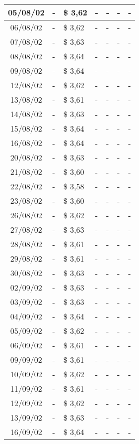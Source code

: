 \begin{center}
\begin{longtable}{|c|p{1.5cm}|p{1.5cm}|p{1.5cm}|p{1.5cm}|p{1.5cm}|p{1.5cm}|}
05/08/02 & - & \$ 3,62 & - & - & - & - \\ \hline
06/08/02 & - & \$ 3,62 & - & - & - & - \\ \hline
07/08/02 & - & \$ 3,63 & - & - & - & - \\ \hline
08/08/02 & - & \$ 3,64 & - & - & - & - \\ \hline
09/08/02 & - & \$ 3,64 & - & - & - & - \\ \hline
12/08/02 & - & \$ 3,62 & - & - & - & - \\ \hline
13/08/02 & - & \$ 3,61 & - & - & - & - \\ \hline
14/08/02 & - & \$ 3,63 & - & - & - & - \\ \hline
15/08/02 & - & \$ 3,64 & - & - & - & - \\ \hline
16/08/02 & - & \$ 3,64 & - & - & - & - \\ \hline
20/08/02 & - & \$ 3,63 & - & - & - & - \\ \hline
21/08/02 & - & \$ 3,60 & - & - & - & - \\ \hline
22/08/02 & - & \$ 3,58 & - & - & - & - \\ \hline
23/08/02 & - & \$ 3,60 & - & - & - & - \\ \hline
26/08/02 & - & \$ 3,62 & - & - & - & - \\ \hline
27/08/02 & - & \$ 3,63 & - & - & - & - \\ \hline
28/08/02 & - & \$ 3,61 & - & - & - & - \\ \hline
29/08/02 & - & \$ 3,61 & - & - & - & - \\ \hline
30/08/02 & - & \$ 3,63 & - & - & - & - \\ \hline
02/09/02 & - & \$ 3,63 & - & - & - & - \\ \hline
03/09/02 & - & \$ 3,63 & - & - & - & - \\ \hline
04/09/02 & - & \$ 3,64 & - & - & - & - \\ \hline
05/09/02 & - & \$ 3,62 & - & - & - & - \\ \hline
06/09/02 & - & \$ 3,61 & - & - & - & - \\ \hline
09/09/02 & - & \$ 3,61 & - & - & - & - \\ \hline
10/09/02 & - & \$ 3,62 & - & - & - & - \\ \hline
11/09/02 & - & \$ 3,61 & - & - & - & - \\ \hline
12/09/02 & - & \$ 3,62 & - & - & - & - \\ \hline
13/09/02 & - & \$ 3,63 & - & - & - & - \\ \hline
16/09/02 & - & \$ 3,64 & - & - & - & - \\ \hline

\end{longtable}
\end{center}
